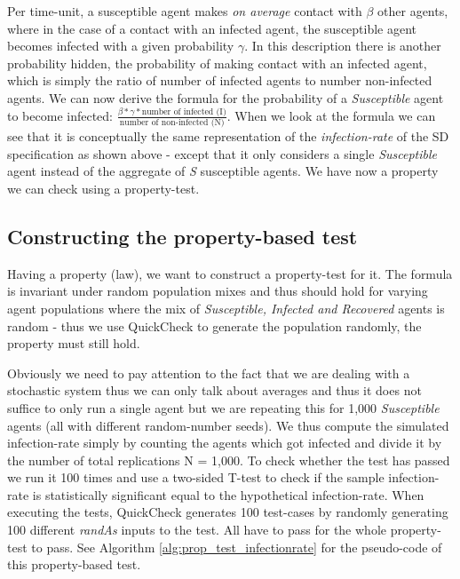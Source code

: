 Per time-unit, a susceptible agent makes \textit{on average} contact with $\beta$ other agents, where in the case of a contact with an infected agent, the susceptible agent becomes infected with a given probability $\gamma$. In this description there is another probability hidden, the probability of making contact with an infected agent, which is simply the ratio of number of infected agents to number non-infected agents. We can now derive the formula for the probability of a \textit{Susceptible} agent to become infected: $\frac{\beta * \gamma * \text{number of infected (I)}}{\text{number of non-infected (N)}}$. When we look at the formula we can see that it is conceptually the same representation of the \textit{infection-rate} of the SD specification as shown above - except that it only considers a single \textit{Susceptible} agent instead of the aggregate of \textit{S} susceptible agents. We have now a property we can check using a property-test.

\subsection{Constructing the property-based test}
Having a property (law), we want to construct a property-test for it. The formula is invariant under random population mixes and thus should hold for varying agent populations where the mix of \textit{Susceptible, Infected and Recovered} agents is random - thus we use QuickCheck to generate the population randomly, the property must still hold.

Obviously we need to pay attention to the fact that we are dealing with a stochastic system thus we can only talk about averages and thus it does not suffice to only run a single agent but we are repeating this for 1,000 \textit{Susceptible} agents (all with different random-number seeds). We thus compute the simulated infection-rate simply by counting the agents which got infected and divide it by the number of total replications N = 1,000. To check whether the test has passed we run it 100 times and use a two-sided T-test to check if the sample infection-rate is statistically significant equal to the hypothetical infection-rate. When executing the tests, QuickCheck generates 100 test-cases by randomly generating 100 different \textit{randAs} inputs to the test. All have to pass for the whole property-test to pass. See Algorithm \ref{alg:prop_test_infectionrate} for the pseudo-code of this property-based test.

